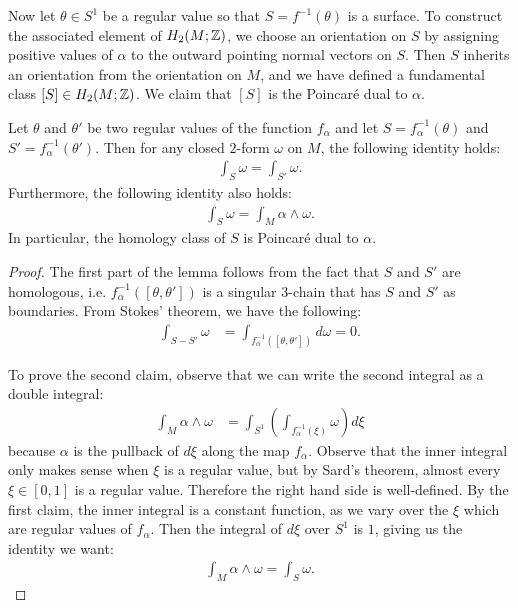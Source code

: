 Now let $\theta \in S^1$ be a regular value so that $S = f^{-1}(\theta)$ is a surface.
To construct the associated element of $H_2(M;\mathbb{Z})$, we choose an orientation on $S$ by assigning positive values of $\alpha$ to the outward pointing normal vectors on $S$.
Then $S$ inherits an orientation from the orientation on $M$, and we have defined a
fundamental class $[S]\in H_2(M;\mathbb{Z})$.
We claim that $[S]$ is the Poincar\'e dual to $\alpha$.
\begin{lem}
  Let $\theta$ and $\theta'$ be two regular values of the function $f_{\alpha}$ and let $S=f_\alpha^{-1}(\theta)$ and $S'=f_\alpha^{-1}(\theta')$.
  Then for any closed $2$-form $\omega$ on $M$, the following identity holds:
  \begin{align*}
    \int_{S} \omega = \int_{S'} \omega.
  \end{align*}
  Furthermore, the following identity also holds:
  \begin{align*}
    \int_S \omega = \int_M \alpha \wedge \omega.
  \end{align*}
  In particular, the homology class of $S$ is Poincar\'e dual to $\alpha$.
\end{lem}
\begin{proof}
  The first part of the lemma follows from the fact that $S$ and $S'$ are homologous, i.e. $f^{-1}_{\alpha}([\theta, \theta'])$ is a singular $3$-chain that has $S$ and $S'$ as boundaries.
  From Stokes' theorem, we have the following:
  \begin{align*}
    \int_{S - S'} \omega &= \int_{f_{\alpha}^{-1}([\theta, \theta'])} d\omega
                         = 0.
  \end{align*}

  To prove the second claim, observe that we can write the second integral as a double integral:
  \begin{align*}
    \int_M \alpha \wedge \omega &= \int_{S^1} \left(   \int_{f_{\alpha}^{-1}(\xi)} \omega \right) d\xi
  \end{align*}
   because $\alpha$ is the pullback of $d\xi$ along the map $f_{\alpha}$.
  Observe that the inner integral only makes sense when $\xi$ is a regular value, but by Sard's theorem, almost every $\xi \in [0,1]$ is a regular value.  Therefore the right hand side is well-defined.
  By the first claim, the inner integral is a constant function, as we vary over the $\xi$ which are regular values of $f_{\alpha}$.
  Then the integral of $d\xi$ over $S^1$ is $1$, giving us the identity we want:
  \begin{align*}
    \int_M \alpha \wedge \omega = \int_S \omega.
  \end{align*}
\end{proof}
